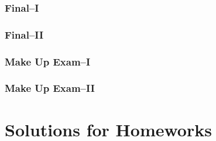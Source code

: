 \documentclass[a4paper,12pt]{book}
\begin{document}
\subsection{Final--I}


\subsection{Final--II}


\subsection{Make Up Exam--I}


\subsection{Make Up Exam--II}


\chapter{Solutions for Homeworks}













\end{document}
